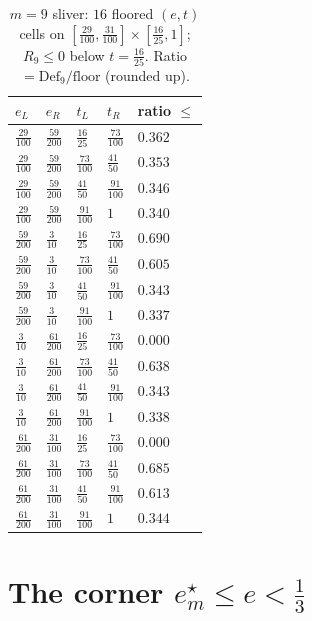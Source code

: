 \documentclass[11pt]{amsart}
\newcommand{\Def}{\mathrm{Def}}
\begin{document}
\begin{table}[h]\centering\small
\caption{$m=9$ sliver: $16$ floored $(e,t)$ cells on
$[\tfrac{29}{100},\tfrac{31}{100}]\times[\tfrac{16}{25},1]$; $R_9\le0$ below
$t=\tfrac{16}{25}$.  Ratio $=\Def_9/\text{floor}$ (rounded up).}
\label{zc9:tab:sliver}
\begin{tabular}{lllll}\toprule
$e_L$&$e_R$&$t_L$&$t_R$&ratio $\le$\\\midrule
$\tfrac{29}{100}$&$\tfrac{59}{200}$&$\tfrac{16}{25}$&$\tfrac{73}{100}$&$0.362$\\
$\tfrac{29}{100}$&$\tfrac{59}{200}$&$\tfrac{73}{100}$&$\tfrac{41}{50}$&$0.353$\\
$\tfrac{29}{100}$&$\tfrac{59}{200}$&$\tfrac{41}{50}$&$\tfrac{91}{100}$&$0.346$\\
$\tfrac{29}{100}$&$\tfrac{59}{200}$&$\tfrac{91}{100}$&$1$&$0.340$\\
$\tfrac{59}{200}$&$\tfrac3{10}$&$\tfrac{16}{25}$&$\tfrac{73}{100}$&$0.690$\\
$\tfrac{59}{200}$&$\tfrac3{10}$&$\tfrac{73}{100}$&$\tfrac{41}{50}$&$0.605$\\
$\tfrac{59}{200}$&$\tfrac3{10}$&$\tfrac{41}{50}$&$\tfrac{91}{100}$&$0.343$\\
$\tfrac{59}{200}$&$\tfrac3{10}$&$\tfrac{91}{100}$&$1$&$0.337$\\
$\tfrac3{10}$&$\tfrac{61}{200}$&$\tfrac{16}{25}$&$\tfrac{73}{100}$&$0.000$\\
$\tfrac3{10}$&$\tfrac{61}{200}$&$\tfrac{73}{100}$&$\tfrac{41}{50}$&$0.638$\\
$\tfrac3{10}$&$\tfrac{61}{200}$&$\tfrac{41}{50}$&$\tfrac{91}{100}$&$0.343$\\
$\tfrac3{10}$&$\tfrac{61}{200}$&$\tfrac{91}{100}$&$1$&$0.338$\\
$\tfrac{61}{200}$&$\tfrac{31}{100}$&$\tfrac{16}{25}$&$\tfrac{73}{100}$&$0.000$\\
$\tfrac{61}{200}$&$\tfrac{31}{100}$&$\tfrac{73}{100}$&$\tfrac{41}{50}$&$0.685$\\
$\tfrac{61}{200}$&$\tfrac{31}{100}$&$\tfrac{41}{50}$&$\tfrac{91}{100}$&$0.613$\\
$\tfrac{61}{200}$&$\tfrac{31}{100}$&$\tfrac{91}{100}$&$1$&$0.344$\\
\bottomrule\end{tabular}
\end{table}

\section{The corner $e^\star_m\le e<\tfrac13$}\label{zc9:sec:wide}
\end{document}

